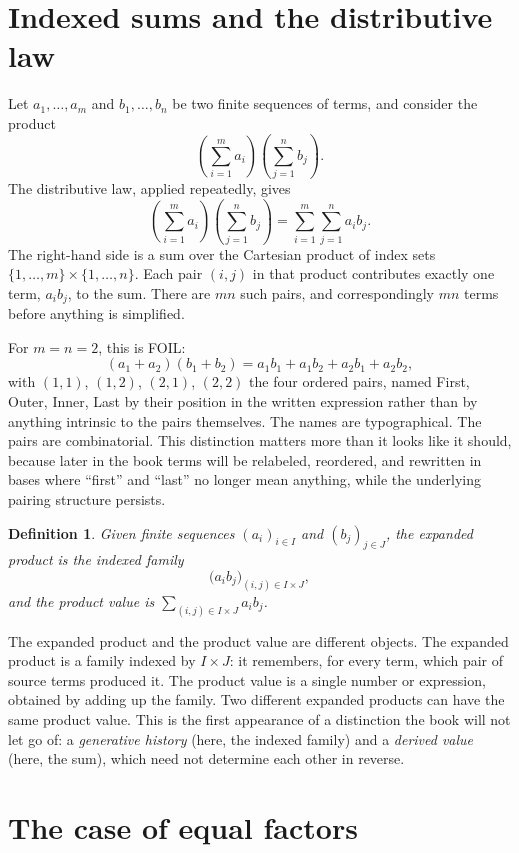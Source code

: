 \documentclass[11pt]{book}
\newtheorem{definition}[theorem]{Definition}
\begin{document}
\section{Indexed sums and the distributive law}

Let $a_1,\ldots,a_m$ and $b_1,\ldots,b_n$ be two finite sequences of terms, and consider the product
\[
\left(\sum_{i=1}^m a_i\right)\left(\sum_{j=1}^n b_j\right).
\]
The distributive law, applied repeatedly, gives
\[
\left(\sum_{i=1}^m a_i\right)\left(\sum_{j=1}^n b_j\right) = \sum_{i=1}^m\sum_{j=1}^n a_ib_j.
\]
The right-hand side is a sum over the Cartesian product of index sets $\{1,\ldots,m\}\times\{1,\ldots,n\}$. Each pair $(i,j)$ in that product contributes exactly one term, $a_ib_j$, to the sum. There are $mn$ such pairs, and correspondingly $mn$ terms before anything is simplified.

For $m=n=2$, this is FOIL:
\[
(a_1+a_2)(b_1+b_2) = a_1b_1+a_1b_2+a_2b_1+a_2b_2,
\]
with $(1,1)$, $(1,2)$, $(2,1)$, $(2,2)$ the four ordered pairs, named First, Outer, Inner, Last by their position in the written expression rather than by anything intrinsic to the pairs themselves. The names are typographical. The pairs are combinatorial. This distinction matters more than it looks like it should, because later in the book terms will be relabeled, reordered, and rewritten in bases where ``first'' and ``last'' no longer mean anything, while the underlying pairing structure persists.

\begin{definition}
Given finite sequences $(a_i)_{i \in I}$ and $(b_j)_{j \in J}$, the \emph{expanded product} is the indexed family
\[
\bigl(a_ib_j\bigr)_{(i,j)\in I\times J},
\]
and the \emph{product value} is $\sum_{(i,j)\in I\times J} a_ib_j$.
\end{definition}

The expanded product and the product value are different objects. The expanded product is a family indexed by $I \times J$: it remembers, for every term, which pair of source terms produced it. The product value is a single number or expression, obtained by adding up the family. Two different expanded products can have the same product value. This is the first appearance of a distinction the book will not let go of: a \emph{generative history} (here, the indexed family) and a \emph{derived value} (here, the sum), which need not determine each other in reverse.

\section{The case of equal factors}
\end{document}
